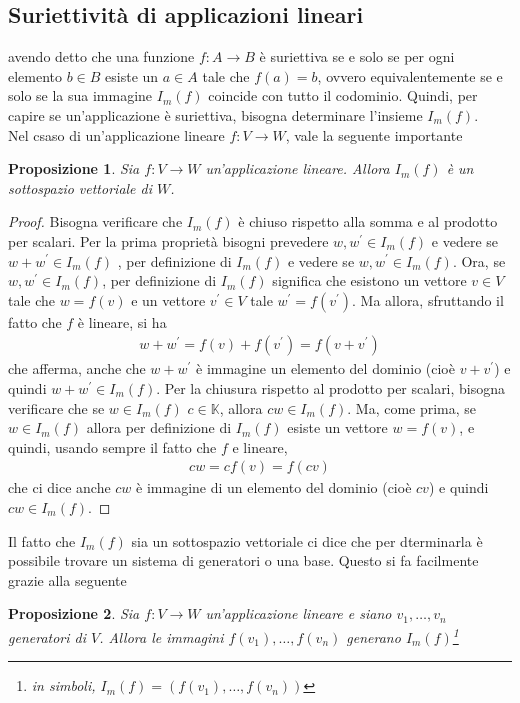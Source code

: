 \documentclass{book}
\theoremstyle{definition}
\theoremstyle{plain}
\newtheorem{prop}{Proposizione}[section]
\begin{document}
\subsection{Suriettività di applicazioni lineari}
\label{sec:suriappllin}
avendo detto che una funzione $f:A\to B$ è suriettiva se e solo se per
ogni elemento $b\in B$ esiste un $a\in A$ tale che $f(a)=b$, ovvero
equivalentemente se e solo se la sua immagine $I_m(f)$ coincide con tutto
il codominio. Quindi, per capire se un'applicazione è suriettiva,
bisogna determinare l'insieme $I_m(f)$.\\
Nel csaso di un'applicazione lineare $f:V\to W$, vale la seguente
importante
\begin{prop}
  \label{prop:suriappllin1}
  Sia $f:V\to W$ un'applicazione lineare. Allora $I_m(f)$ è un
  sottospazio vettoriale di $W$.
\end{prop}
\begin{proof}
  Bisogna verificare che $I_m(f)$ è chiuso rispetto alla somma e al
  prodotto per scalari. Per la prima proprietà bisogni prevedere $w,
  w^\prime\in I_m(f)$ e vedere se $w+w^\prime\in I_m(f)$ , per definizione
  di $I_m(f)$ e vedere se $w,w^\prime\in I_m(f)$. Ora, se
  $w,w^\prime\in I_m(f)$, per definizione di $I_m(f)$ significa che
  esistono un vettore $v\in V$ tale che $w=f(v)$ e un vettore
  $v^\prime\in V$ tale $w^\prime=f(v^\prime)$. Ma allora, sfruttando il
  fatto che $f$ è lineare, si ha
  \begin{eqnarray*}
    w+w^\prime=f(v)+f(v^\prime)=f(v+v^\prime)
  \end{eqnarray*}
  che afferma, anche che $w+w^\prime$ è immagine un elemento del dominio
  (cioè $v+v^\prime$) e quindi $w+w^\prime\in I_m(f)$.
  Per la chiusura rispetto al prodotto per scalari, bisogna verificare
  che se $w\in I_m(f)$ $c\in \mathds{K}$, allora $cw\in I_m(f)$. Ma, come
  prima, se $w\in I_m(f)$ allora per definizione di $I_m(f)$ esiste un
  vettore $w=f(v)$, e quindi, usando sempre il fatto che $f$ e lineare,
  \begin{eqnarray*}
    cw=cf(v)=f(cv)
  \end{eqnarray*}
  che ci dice anche $cw$ è immagine di un elemento del dominio (cioè
  $cv$) e quindi $cw\in I_m(f)$.
\end{proof}
Il fatto che $I_m(f)$ sia un sottospazio vettoriale ci dice che per
dterminarla è possibile trovare un sistema di generatori o una base.
Questo si fa facilmente grazie alla seguente
\begin{prop}
  \label{prop:suriappllin2}
  Sia $f:V\to W$ un'applicazione lineare e siano $v_1,\dots, v_n$
  generatori di $V$. Allora le immagini $f(v_1),\dots,f(v_n)$ generano
  $I_m(f)$\footnote{in simboli, $I_m(f)=(f(v_1),\dots,f(v_n))$}
\end{prop}
\end{document}
